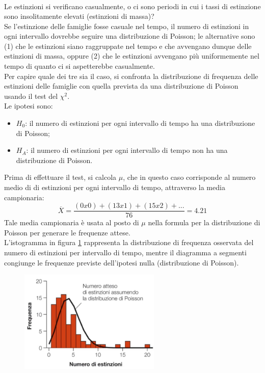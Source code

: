 \documentclass[10pt, draft]{book}
\newcounter{example}[section]
\begin{document}
\begin{example}
\begin{table}[H]
\begin{tabular}{c|c}
        \hline
        \end{tabular}
        \caption{}
        \label{tabestinzioni}
\end{table}\noindent
Le estinzioni si verificano casualmente, o ci sono periodi in cui i tassi di estinzione sono insolitamente elevati (estinzioni di massa)?
\\
Se l'estinzione delle famiglie fosse casuale nel tempo, il numero di estinzioni in ogni intervallo dovrebbe seguire una distribuzione di Poisson; le alternative sono (1) che le estinzioni siano raggruppate nel tempo e che avvengano dunque delle estinzioni di massa, oppure (2) che le estinzioni avvengano più uniformemente nel tempo di quanto ci si aspetterebbe casualmente.
\\
Per capire quale dei tre sia il caso, si confronta la distribuzione di frequenza delle estinzioni delle famiglie con quella prevista da una distribuzione di Poisson usando il test del $\chi^2$.
\\
Le ipotesi sono:
\begin{itemize}
    \item $H_0$: il numero di estinzioni per ogni intervallo di tempo ha una distribuzione di Poisson;
    \item $H_A$: il numero di estinzioni per ogni intervallo di tempo non ha una distribuzione di Poisson.
\end{itemize}
Prima di effettuare il test, si calcola $\mu$, che in questo caso corrisponde al numero medio di di estinzioni per ogni intervallo di tempo, attraverso la media campionaria:
\begin{equation}
\overline{X} = \frac{(0x0)+(13x1)+(15x2)+...}{76} = 4.21
\end{equation}
Tale media campionaria è usata al posto di $\mu$ nella formula per la distribuzione di Poisson per generare le frequenze attese.
\\
L'istogramma in figura \ref{fig8.6-2} rappresenta la distribuzione di frequenza osservata del numero di estinzioni per intervallo di tempo, mentre il diagramma a segmenti congiunge le frequenze previste dell'ipotesi nulla (distribuzione di Poisson).
    \begin{figure}[H]\label{fig8.6-2}
    \centering
    \includegraphics[width=0.6\textwidth]{fig8.6-2}

\end{figure}
\end{example}
\end{document}
